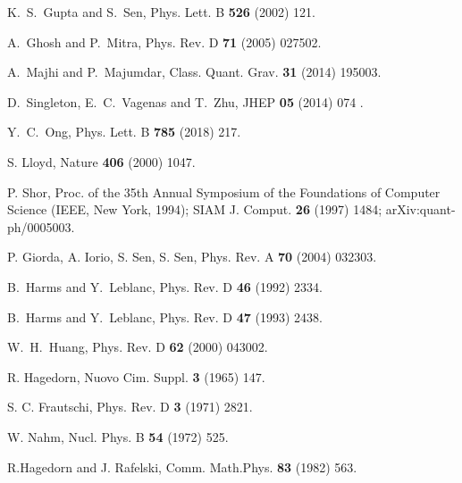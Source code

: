 \documentclass[aps,prd,showkeys,nofootinbib,superscriptaddress]{revtex4-2}
\begin{document}
\begin{thebibliography}{99}
K.~S.~Gupta and S.~Sen,
Phys. Lett. B \textbf{526} (2002) 121.

A.~Ghosh and P.~Mitra,
Phys. Rev. D \textbf{71} (2005) 027502.

A.~Majhi and P.~Majumdar,
Class. Quant. Grav. \textbf{31} (2014) 195003.

D.~Singleton, E.~C.~Vagenas and T.~Zhu,
JHEP \textbf{05} (2014) 074 .

Y.~C.~Ong,
Phys. Lett. B \textbf{785} (2018) 217.

S. Lloyd,
Nature {\bf 406} (2000) 1047.

P. Shor,
Proc. of the 35th Annual Symposium of the Foundations of Computer Science (IEEE, New York, 1994);
SIAM J. Comput. {\bf 26} (1997) 1484; arXiv:quant-ph/0005003.

P. Giorda, A. Iorio, S. Sen, S. Sen, Phys. Rev. A {\bf 70} (2004) 032303.


B.~Harms and Y.~Leblanc,
Phys. Rev. D \textbf{46} (1992) 2334.

B.~Harms and Y.~Leblanc,
Phys. Rev. D \textbf{47} (1993) 2438.

W.~H.~Huang,
Phys. Rev. D \textbf{62} (2000) 043002.

R. Hagedorn,
Nuovo Cim. Suppl. {\bf 3} (1965) 147.

S. C. Frautschi,
Phys. Rev. D {\bf 3} (1971) 2821.

 W. Nahm,
 Nucl. Phys. B {\bf 54} (1972) 525.

R.Hagedorn and J. Rafelski,
Comm. Math.Phys. {\bf 83} (1982) 563.


\end{thebibliography}
\end{document}
